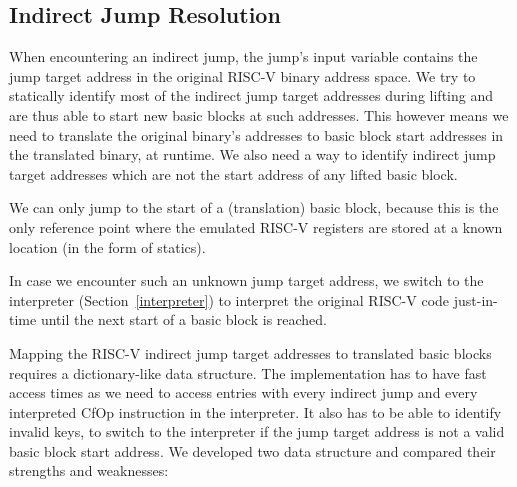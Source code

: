 \documentclass[course=eragp]{aspdoc}
\begin{document}
\subsection{Indirect Jump Resolution}\label{ijump_resolution}

When encountering an indirect jump, the jump's input variable contains the jump target address in the
original RISC-V binary address space. We try to statically identify most of the indirect jump target
addresses during lifting and are thus able to start new basic blocks at such addresses.
This however means we need to translate the original binary's addresses to basic block start
addresses in the translated binary, at runtime. We also need a way to identify
indirect jump target addresses which are not the start address of any lifted basic block.

We can only jump to the start of a (translation) basic block, because this is the only reference point where the
emulated RISC-V registers are stored at a known location (in the form of statics).

In case we encounter such an unknown jump target address, we switch to the interpreter (Section~\ref{interpreter}) to
interpret the original RISC-V code just-in-time until the next start of a basic block is reached.

\par

Mapping the RISC-V indirect jump target addresses to translated basic blocks requires a
dictionary-like data structure.
The implementation has to have fast access times as we need to access entries with
every indirect jump and every interpreted CfOp instruction in the interpreter. It also has to be able
to identify invalid keys, to switch to the interpreter if the
jump target address is not a valid basic block start address. We developed two data structure and
compared their strengths and weaknesses:
\end{document}
